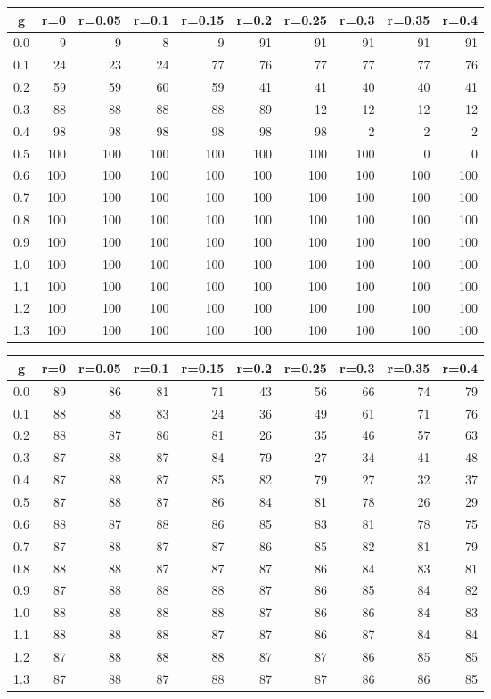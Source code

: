 %
\begin{table}[!tbp]
 \begin{center}
 \begin{tabular}{rrrrrrrrrr}\hline\hline
\multicolumn{1}{c}{g}&\multicolumn{1}{c}{r=0}&\multicolumn{1}{c}{r=0.05}&\multicolumn{1}{c}{r=0.1}&\multicolumn{1}{c}{r=0.15}&\multicolumn{1}{c}{r=0.2}&\multicolumn{1}{c}{r=0.25}&\multicolumn{1}{c}{r=0.3}&\multicolumn{1}{c}{r=0.35}&\multicolumn{1}{c}{r=0.4}\tabularnewline
\hline
0.0&  9&  9&  8&  9& 91& 91& 91& 91& 91\tabularnewline
0.1& 24& 23& 24& 77& 76& 77& 77& 77& 76\tabularnewline
0.2& 59& 59& 60& 59& 41& 41& 40& 40& 41\tabularnewline
0.3& 88& 88& 88& 88& 89& 12& 12& 12& 12\tabularnewline
0.4& 98& 98& 98& 98& 98& 98&  2&  2&  2\tabularnewline
0.5&100&100&100&100&100&100&100&  0&  0\tabularnewline
0.6&100&100&100&100&100&100&100&100&100\tabularnewline
0.7&100&100&100&100&100&100&100&100&100\tabularnewline
0.8&100&100&100&100&100&100&100&100&100\tabularnewline
0.9&100&100&100&100&100&100&100&100&100\tabularnewline
1.0&100&100&100&100&100&100&100&100&100\tabularnewline
1.1&100&100&100&100&100&100&100&100&100\tabularnewline
1.2&100&100&100&100&100&100&100&100&100\tabularnewline
1.3&100&100&100&100&100&100&100&100&100\tabularnewline
\hline
\end{tabular}

\end{center}

\end{table}

%
\begin{table}[!tbp]
 \begin{center}
 \begin{tabular}{rrrrrrrrrr}\hline\hline
\multicolumn{1}{c}{g}&\multicolumn{1}{c}{r=0}&\multicolumn{1}{c}{r=0.05}&\multicolumn{1}{c}{r=0.1}&\multicolumn{1}{c}{r=0.15}&\multicolumn{1}{c}{r=0.2}&\multicolumn{1}{c}{r=0.25}&\multicolumn{1}{c}{r=0.3}&\multicolumn{1}{c}{r=0.35}&\multicolumn{1}{c}{r=0.4}\tabularnewline
\hline
0.0&89&86&81&71&43&56&66&74&79\tabularnewline
0.1&88&88&83&24&36&49&61&71&76\tabularnewline
0.2&88&87&86&81&26&35&46&57&63\tabularnewline
0.3&87&88&87&84&79&27&34&41&48\tabularnewline
0.4&87&88&87&85&82&79&27&32&37\tabularnewline
0.5&87&88&87&86&84&81&78&26&29\tabularnewline
0.6&88&87&88&86&85&83&81&78&75\tabularnewline
0.7&87&88&87&87&86&85&82&81&79\tabularnewline
0.8&88&88&87&87&87&86&84&83&81\tabularnewline
0.9&87&88&88&88&87&86&85&84&82\tabularnewline
1.0&88&88&88&88&87&86&86&84&83\tabularnewline
1.1&88&88&88&87&87&86&87&84&84\tabularnewline
1.2&87&88&88&88&87&87&86&85&85\tabularnewline
1.3&87&88&87&88&87&87&86&86&85\tabularnewline
\hline
\end{tabular}

\end{center}

\end{table}

